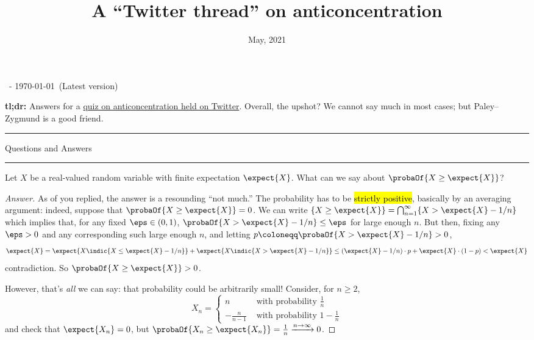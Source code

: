 \documentclass[10pt]{article}
\title{A ``Twitter thread'' on anticoncentration}
\date{May, 2021}
\renewcommand{\eqdef}{\coloneqq}
\begin{document}
\begin{flushleft}\sf\footnotesize
\makeatletter
\@date~- \today~(Latest version) \hfill \@title
\makeatother
\end{flushleft}
\vspace{5mm}

\noindent\textbf{tl;dr:} Answers for a \href{https://twitter.com/ccanonne_/status/1395502810804883461}{quiz on anticoncentration held on Twitter}. Overall, the upshot? We cannot say much in most cases; but Paley--Zygmund is a good friend.\bigskip

\hrule
\begin{center}\sc
Questions and Answers
\end{center}
\hrule\medskip

\begin{quest}
Let $X$ be a real-valued random variable with finite expectation $\expect{X}$. What can we say about $\probaOf{X \geq \expect{X}}$?
\end{quest}
\begin{proof}[Answer]
As  of you replied, the answer is a resounding ``not much.'' The probability has to be \hl{strictly positive}, basically by an averaging argument: indeed, suppose that $\probaOf{X \geq \expect{X}}=0$. We can write
$
    \{X \geq \expect{X}\} = \bigcap_{n=1}^\infty \{X > \expect{X} - 1/n\}
$
which implies that, for any fixed $\eps\in(0,1)$, $\probaOf{X > \expect{X} - 1/n} \leq \eps$ for large enough $n$. But then, fixing any $\eps>0$ and any corresponding such large enough $n$, and letting $p \eqdef \probaOf{X > \expect{X} - 1/n} > 0$,
\[
  \expect{X} = \expect{X\indic{X \leq \expect{X} - 1/n}} + \expect{X\indic{X > \expect{X} - 1/n}}
  \leq (\expect{X} - 1/n)\cdot p + \expect{X}\cdot (1-p) <  \expect{X}
\]
contradiction. So $\probaOf{X \geq \expect{X}}>0$.

\noindent However, that's \emph{all} we can say: that probability could be arbitrarily small! Consider, for $n\geq 2$,
\[
  X_n = \begin{cases}
      n & \text{ with probability } \frac{1}{n}\\
      -\frac{n}{n-1} & \text{ with probability } 1-\frac{1}{n}
    \end{cases}
\]
and check that $\expect{X_n}=0$, but $\probaOf{X_n \geq \expect{X_n}} = \frac{1}{n} \xrightarrow[]{n\to\infty} 0$.
\end{proof}
\end{document}
